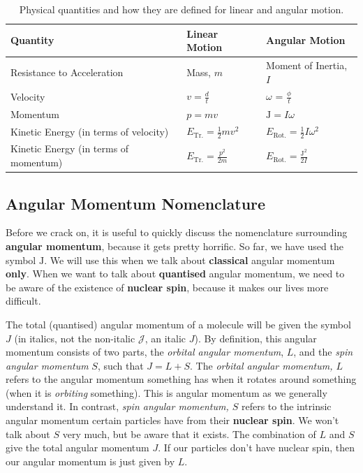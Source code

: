 \documentclass{memoir}[11pt,oneside,a4paper,openany]
\newcommand{\Jc}{\ensuremath{\mathrm{J}}}
\begin{document}
\begin{table}[]
\centering
\begin{tabular}{@{}lll@{}}
\toprule
Quantity & Linear Motion & Angular Motion \\ \midrule
Resistance to Acceleration & Mass, $m$ & Moment of Inertia, $I$  \\
Velocity  & $v = \frac{d}{t}$ & $\omega$ = $\frac{\phi}{t}$ \\
Momentum & $p = mv$ & $\Jc = I\omega$ \\
Kinetic Energy (in terms of velocity) & $E_{\text{Tr.}} = \frac{1}{2}mv^2$ & $E_{\text{Rot.}} = \frac{1}{2}I\omega^2$  \\
Kinetic Energy (in terms of momentum) & $E_{\text{Tr.}} = \frac{p^2}{2m}$ & $E_{\text{Rot.}} = \frac{\Jc^2}{2I}$ \\ \bottomrule
\end{tabular}
	\caption{Physical quantities and how they are defined for linear and angular motion.}\label{tab:lin_ang}
\end{table}

\subsection{Angular Momentum Nomenclature}
Before we crack on, it is useful to quickly discuss the nomenclature surrounding \textbf{angular momentum}, because it gets pretty horrific. So far, we have used the symbol $\Jc$. We will use this when we talk about \textbf{classical} angular momentum \textbf{only}. When we want to talk about \textbf{quantised} angular momentum, we need to be aware of the existence of \textbf{nuclear spin}, because it makes our lives more difficult.

The total (quantised) angular momentum of a molecule will be given the symbol $J$ (in italics, not the non-italic $\mathcal{J}$, an italic $J$). By definition, this angular momentum consists of two parts, the \emph{orbital angular momentum}, $L$, and the \emph{spin angular momentum} $S$, such that $J = L+S$. The \emph{orbital angular momentum, $L$} refers to the angular momentum something has when it rotates around something (when it is \emph{orbiting} something). This is angular momentum as we generally understand it. In contrast, \emph{spin angular momentum, $S$} refers to the intrinsic angular momentum certain particles have from their \textbf{nuclear spin}. We won't talk about $S$ very much, but be aware that it exists. The combination of $L$ and $S$ give the total angular momentum $J$. If our particles don't have nuclear spin, then our angular momentum is just given by $L$.  
\end{document}
